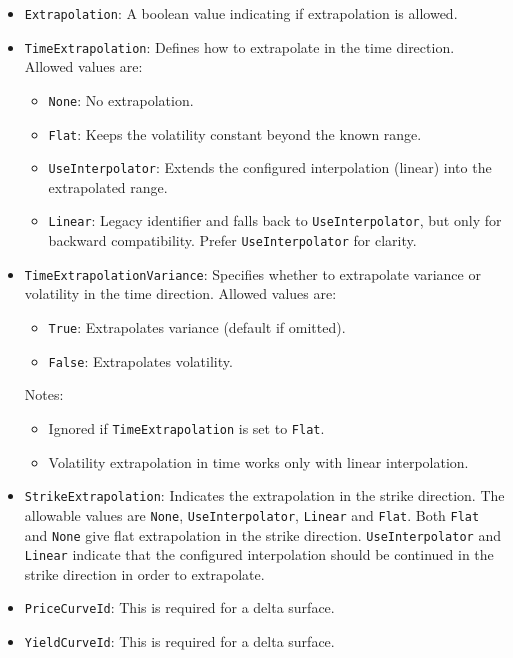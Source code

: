 \begin{itemize}
\item \lstinline!Extrapolation!:
A boolean value indicating if extrapolation is allowed.

\item \lstinline!TimeExtrapolation!:
Defines how to extrapolate in the time direction. Allowed values are:
  \begin{itemize}
    \item \lstinline!None!: No extrapolation.
    \item \lstinline!Flat!: Keeps the volatility constant beyond the known range.
    \item \lstinline!UseInterpolator!: Extends the configured interpolation (linear) into the extrapolated range.
    \item \lstinline!Linear!: Legacy identifier and falls back to \lstinline!UseInterpolator!, but only for backward compatibility. Prefer \lstinline!UseInterpolator! for clarity.
  \end{itemize}

\item \lstinline!TimeExtrapolationVariance!:
Specifies whether to extrapolate variance or volatility in the time direction. Allowed values are:
  \begin{itemize}
    \item \lstinline!True!: Extrapolates variance (default if omitted).
    \item \lstinline!False!: Extrapolates volatility.
  \end{itemize}
  Notes:
  \begin{itemize}
    \item Ignored if \lstinline!TimeExtrapolation! is set to \lstinline!Flat!.
    \item Volatility extrapolation in time works only with linear interpolation.
  \end{itemize}

\item \lstinline!StrikeExtrapolation!:
Indicates the extrapolation in the strike direction. The allowable values are \lstinline!None!, \lstinline!UseInterpolator!, \lstinline!Linear! and \lstinline!Flat!. Both \lstinline!Flat! and \lstinline!None! give flat extrapolation in the strike direction. \lstinline!UseInterpolator! and \lstinline!Linear! indicate that the configured interpolation should be continued in the strike direction in order to extrapolate.

\item \lstinline!PriceCurveId!:
This is required for a delta surface.

\item \lstinline!YieldCurveId!:
This is required for a delta surface.

\end{itemize}

